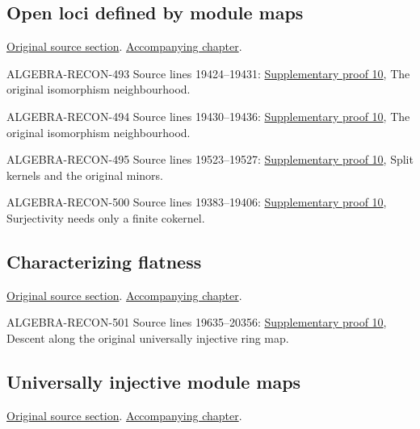 \subsection{Open loci defined by module maps}
\hypertarget{algebra-source-section-loci-maps}{}
\noindent\href{https://github.com/stacks/stacks-project/blob/a04446e57ec1fbc252a871afcec7752fb2807b14/algebra.tex\#L19375}{Original source section}. \href{algebra.pdf\#nameddest=section-loci-maps}{Accompanying chapter}.

\begin{AlgebraSourceRoutes}
\item[ALGEBRA-RECON-493] Source lines 19424--19431: \hyperlink{algebra_open_loci_pure_descent_notes_20260927}{Supplementary proof 10}, The original isomorphism neighbourhood.
\item[ALGEBRA-RECON-494] Source lines 19430--19436: \hyperlink{algebra_open_loci_pure_descent_notes_20260927}{Supplementary proof 10}, The original isomorphism neighbourhood.
\item[ALGEBRA-RECON-495] Source lines 19523--19527: \hyperlink{algebra_open_loci_pure_descent_notes_20260927}{Supplementary proof 10}, Split kernels and the original minors.
\item[ALGEBRA-RECON-500] Source lines 19383--19406: \hyperlink{algebra_open_loci_pure_descent_notes_20260927}{Supplementary proof 10}, Surjectivity needs only a finite cokernel.
\end{AlgebraSourceRoutes}

\subsection{Characterizing flatness}
\hypertarget{algebra-source-section-characterize-flatness}{}
\noindent\href{https://github.com/stacks/stacks-project/blob/a04446e57ec1fbc252a871afcec7752fb2807b14/algebra.tex\#L19583}{Original source section}. \href{algebra.pdf\#nameddest=section-characterize-flatness}{Accompanying chapter}.

\begin{AlgebraSourceRoutes}
\item[ALGEBRA-RECON-501] Source lines 19635--20356: \hyperlink{algebra_open_loci_pure_descent_notes_20260927}{Supplementary proof 10}, Descent along the original universally injective ring map.
\end{AlgebraSourceRoutes}

\subsection{Universally injective module maps}
\hypertarget{algebra-source-section-universally-injective}{}
\noindent\href{https://github.com/stacks/stacks-project/blob/a04446e57ec1fbc252a871afcec7752fb2807b14/algebra.tex\#L19742}{Original source section}. \href{algebra.pdf\#nameddest=section-universally-injective}{Accompanying chapter}.

